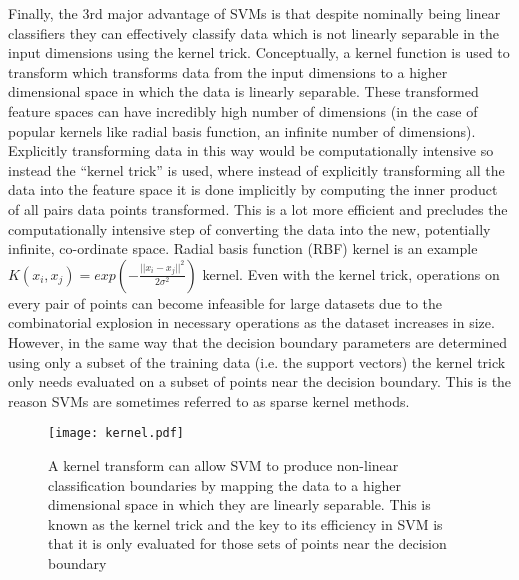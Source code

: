 Finally, the 3rd major advantage of SVMs is that despite nominally being linear classifiers they can effectively classify data which 
is not linearly separable in the input dimensions using the kernel trick.  Conceptually, a kernel function is used to transform
which transforms data from the input dimensions to a higher dimensional space in which the data is linearly separable.
These transformed feature spaces can have incredibly high number of dimensions (in the case of popular kernels like radial basis
function, an infinite number of dimensions).  Explicitly transforming data in this way would be computationally intensive
so instead the ``kernel trick'' is used, where instead of explicitly transforming all the data into the feature space
it is done implicitly by computing the inner product of all pairs data points transformed.  This is a lot more efficient
and precludes the computationally intensive step of converting the data into the new, potentially infinite, co-ordinate space.
Radial basis function (RBF) kernel is an example \(K(x_{i}, x_{j}) = exp ( - \frac{||x_{i} - x_{j}||^{2}}{2\sigma^{2}})\) kernel.
Even with the kernel trick, operations on every pair of points can become infeasible for large datasets due to the combinatorial
explosion in necessary operations as the dataset increases in size.  However, in the same way that the decision boundary parameters 
are determined using only a subset of the training data (i.e. the support vectors) the kernel trick only needs
evaluated on a subset of points near the decision boundary.  This is the reason SVMs are sometimes
referred to as sparse kernel methods.

\begin{figure}[h]
    \texttt{[image: kernel.pdf]}
    \caption{A kernel transform can allow SVM to produce non-linear classification boundaries by mapping
        the data to a higher dimensional space in which they are linearly separable. This is known as the kernel
        trick and the key to its efficiency in SVM is that it is only evaluated for those sets of points near the 
    decision boundary}
    \label{fig:kernel}
\end{figure}



